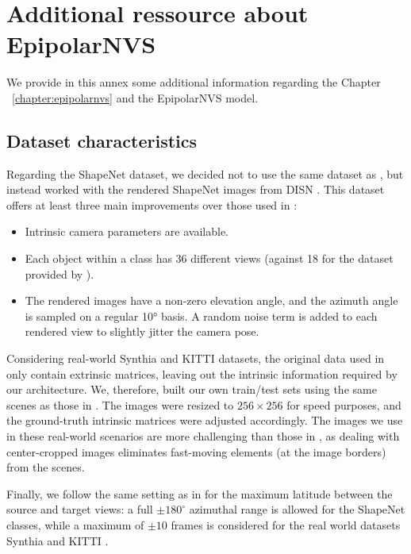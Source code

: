 \chapter{Additional ressource about EpipolarNVS}
\label{annex:epipolarnvs}

We provide in this annex some additional information regarding the Chapter ~\ref{chapter:epipolarnvs} and the EpipolarNVS model. 

\section{Dataset characteristics}
\label{annex:epipolarnvs-dataset}

Regarding the ShapeNet dataset, we decided not to use the same dataset as \citep{kim2020novel, sun2018multiview}, but instead worked with the rendered ShapeNet images from DISN \citep{xu2019disn}. This dataset offers at least three main improvements over those used in \citep{kim2020novel}:

\begin{itemize}
    \item Intrinsic camera parameters are available. 
    \item Each object within a class has 36 different views (against 18 for the dataset provided by \cite{kim2020novel}). 
    \item The rendered images have a non-zero elevation angle, and the azimuth angle is sampled on a regular 10° basis. A random noise term is added to each rendered view to slightly jitter the camera pose. 
\end{itemize}

Considering real-world Synthia \citep{ros2016synthia} and KITTI \citep{geiger2012we} datasets, the original data used in \citep{kim2020novel} only contain extrinsic matrices, leaving out the intrinsic information required by our architecture. We, therefore, built our own train/test sets using the same scenes as those in \citep{kim2020novel}. The images were resized to $256\times256$ for speed purposes, and the ground-truth intrinsic matrices were adjusted accordingly. The images we use in these real-world scenarios are more challenging than those in \citep{kim2020novel,sun2018multiview}, as dealing with center-cropped images eliminates fast-moving elements (at the image borders) from the scenes.

Finally, we follow the same setting as in \citep{kim2020novel} for the maximum latitude between the source and target views: a full $\pm 180^{\circ}$ azimuthal range is allowed for the ShapeNet classes, while a maximum of $\pm 10$ frames is considered for the real world datasets Synthia \citep{ros2016synthia} and KITTI \citep{geiger2012we}.

